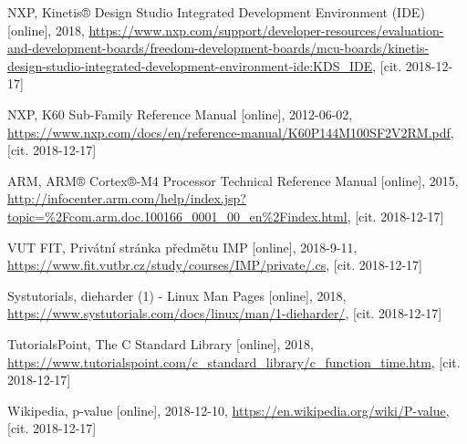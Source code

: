 \documentclass[11pt, a4paper, titlepage]{article}
\begin{document}
\begin{thebibliography}{9}
    NXP,
    Kinetis® Design Studio Integrated Development Environment (IDE) [online],
    2018,
    \url{https://www.nxp.com/support/developer-resources/evaluation-and-development-boards/freedom-development-boards/mcu-boards/kinetis-design-studio-integrated-development-environment-ide:KDS_IDE},
    [cit. 2018-12-17]

    NXP,
    K60 Sub-Family Reference Manual [online],
    2012-06-02,
    \url{https://www.nxp.com/docs/en/reference-manual/K60P144M100SF2V2RM.pdf},
    [cit. 2018-12-17]

    ARM,
    ARM® Cortex®‑M4 Processor Technical Reference Manual [online],
    2015,
    \url{http://infocenter.arm.com/help/index.jsp?topic=%2Fcom.arm.doc.100166_0001_00_en%2Findex.html},
    [cit. 2018-12-17]

    VUT FIT,
    Privátní stránka předmětu IMP [online],
    2018-9-11,
    \url{https://www.fit.vutbr.cz/study/courses/IMP/private/.cs},
    [cit. 2018-12-17]

    Systutorials,
    dieharder (1) - Linux Man Pages [online],
    2018,
    \url{https://www.systutorials.com/docs/linux/man/1-dieharder/},
    [cit. 2018-12-17]

    TutorialsPoint,
    The C Standard Library [online],
    2018,
    \url{https://www.tutorialspoint.com/c_standard_library/c_function_time.htm},
    [cit. 2018-12-17]

    Wikipedia,
    p-value [online],
    2018-12-10,
    \url{https://en.wikipedia.org/wiki/P-value},
    [cit. 2018-12-17]

\end{thebibliography}

\end{document}

